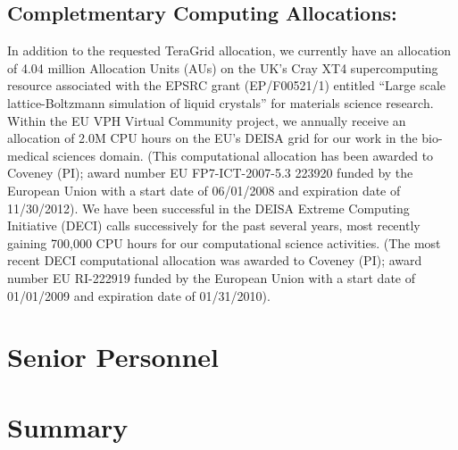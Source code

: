 \documentclass[a4paper,10pt]{article}
\begin{document}
\subsection{Completmentary Computing Allocations:} In addition to the requested TeraGrid allocation, we currently have an allocation of 4.04 million Allocation Units (AUs) on the UK's Cray XT4 supercomputing resource associated with the EPSRC grant (EP/F00521/1) entitled ``Large scale lattice-Boltzmann simulation of liquid crystals'' for materials science research. Within the EU VPH Virtual Community project, we annually receive an allocation of 2.0M CPU hours on the EU's DEISA grid for our work in the bio-medical sciences domain.  (This computational allocation has been awarded to Coveney (PI); award number EU FP7-ICT-2007-5.3 223920 funded by the European Union with a start date of 06/01/2008 and expiration date of 11/30/2012).  We have been successful in the DEISA Extreme Computing Initiative (DECI) calls successively for the past several years, most recently gaining 700,000 CPU hours for our computational science activities.  (The most recent DECI computational allocation was awarded to Coveney (PI); award number EU RI-222919 funded by the European Union with a start date of 01/01/2009 and expiration date of 01/31/2010).

\section{Senior Personnel}




\section*{Summary}
\end{document}
